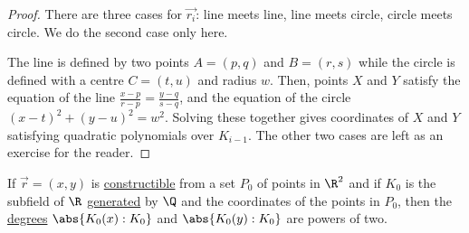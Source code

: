 \documentclass{article}
\begin{document}
\begin{proof}
    There are three cases for $\vec{r_i}$: line meets line, line meets circle, circle meets circle. We do the second case only here.
    \begin{center}
    \end{center}
    The line is defined by two points $A = (p, q)$ and $B = (r, s)$ while the circle is defined with a centre $C = (t, u)$ and radius $w$.
    Then, points $X$ and $Y$ satisfy the equation of the line $\frac{x-p}{r-p} = \frac{y-q}{s-q}$, and the equation of the circle $(x-t)^2 + (y-u)^2 = w^2$.
    Solving these together gives coordinates of $X$ and $Y$ satisfying quadratic polynomials over $K_{i-1}$.
    The other two cases are left as an exercise for the reader.
\end{proof}


\begin{nthm}\label{thm:1.14}
    If $\vec{r} = (x, y)$ is \hyperlink{def:constructible}{constructible} from a set $P_0$ of points in $\R^2$ and if $K_0$ is the subfield of $\R$ \hyperlink{def:genField}{generated} by $\Q$ and the coordinates of the points in $P_0$, then the \hyperlink{def:degreeOfFieldExt}{degrees} $\abs{K_0(x) : K_0}$ and $\abs{K_0(y):K_0}$ are powers of two.
\end{nthm}
\end{document}
